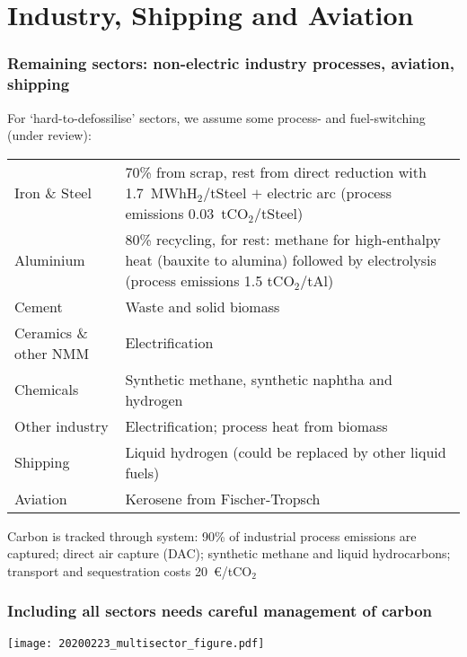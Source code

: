 \documentclass[10pt,aspectratio=169,dvipsnames]{beamer}
\begin{document}
\section{Industry, Shipping and Aviation}





\begin{frame}
  \frametitle{Remaining sectors: non-electric industry processes, aviation, shipping}

  For `hard-to-defossilise' sectors, we assume some process- and fuel-switching (under review):
    \begin{table}
\centering
\begin{tabular}{@{}lp{10cm}@{}}
  \toprule
  Iron \& Steel & 70\% from scrap, rest from direct reduction with 1.7~MWhH$_2$/tSteel $+$ electric arc (process emissions 0.03~tCO$_2$/tSteel)\\
  Aluminium & 80\% recycling, for rest: methane for high-enthalpy heat (bauxite to alumina) followed by electrolysis (process emissions 1.5 tCO$_2$/tAl) \\
  Cement &  Waste and solid biomass \\
  Ceramics \& other NMM &  Electrification\\
  Chemicals & Synthetic methane, synthetic naphtha and hydrogen \\
  Other industry & Electrification; process heat from biomass\\
  Shipping & Liquid hydrogen  (could be replaced by other liquid fuels) \\
  Aviation & Kerosene from Fischer-Tropsch  \\
  \bottomrule
\end{tabular}
\end{table}

 Carbon is tracked through system: 90\% of industrial process emissions are captured; direct air capture (DAC); synthetic methane and liquid hydrocarbons; transport and sequestration costs 20~\euro/tCO$_2$

\end{frame}


\begin{frame}
  \frametitle{Including all sectors needs careful management of carbon}

  \centering
  \texttt{[image: 20200223\_multisector\_figure.pdf]}

\end{frame}
\end{document}
